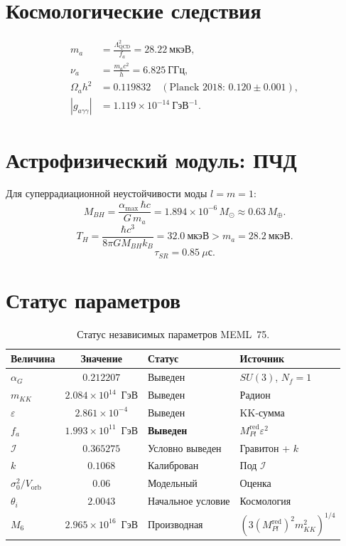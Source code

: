 \documentclass[12pt,a4paper]{article}
\numberwithin{equation}{section}
\begin{document}
\section{Космологические следствия}
\begin{align}
m_a &= \frac{\Lambda_{\text{QCD}}^2}{f_a} = 28.22~\text{мкэВ},\\
\nu_a &= \frac{m_a c^2}{h} = 6.825~\text{ГГц},\\
\Omega_a h^2 &= 0.119832 \quad (\text{Planck 2018: } 0.120 \pm 0.001),\\
|g_{a\gamma\gamma}| &= 1.119\times 10^{-14}~\text{ГэВ}^{-1}.
\end{align}

\section{Астрофизический модуль: ПЧД}
Для суперрадиационной неустойчивости моды $l=m=1$:
\begin{equation}
M_{BH} = \frac{\alpha_{\max}\,\hbar c}{G\,m_a} 
= 1.894\times 10^{-6}\,M_\odot \approx 0.63\,M_\oplus.
\end{equation}
\begin{equation}
T_H = \frac{\hbar c^3}{8\pi G M_{BH} k_B} = 32.0~\text{мкэВ} 
> m_a = 28.2~\text{мкэВ}.
\end{equation}
\begin{equation}
\tau_{SR} = 0.85~\mu\text{с}.
\end{equation}

\section{Статус параметров}
\begin{table}[h!]
\centering
\caption{Статус независимых параметров MEML~75.}
\begin{tabular}{|l|c|l|l|}
\hline
Величина & Значение & Статус & Источник \\
\hline
$\alpha_G$ & $0.212207$ & Выведен & $SU(3)$, $N_f=1$ \\
$m_{KK}$ & $2.084\times 10^{14}$~ГэВ & Выведен & Радион \\
$\varepsilon$ & $2.861\times 10^{-4}$ & Выведен & KK-сумма \\
$f_a$ & $1.993\times 10^{11}$~ГэВ & \textbf{Выведен} & 
$M_{Pl}^{\text{red}}\varepsilon^2$ \\
$\mathcal{I}$ & $0.365275$ & Условно выведен & Гравитон + $k$ \\
$k$ & $0.1068$ & Калиброван & Под $\mathcal{I}$ \\
$\sigma_0^2/V_{\text{orb}}$ & $0.06$ & Модельный & Оценка \\
$\theta_i$ & $2.0043$ & Начальное условие & Космология \\
\hline
$M_6$ & $2.965\times 10^{16}$~ГэВ & Производная & 
$(3(M_{Pl}^{\text{red}})^2 m_{KK}^2)^{1/4}$ \\
\hline
\end{tabular}
\end{table}
\end{document}
